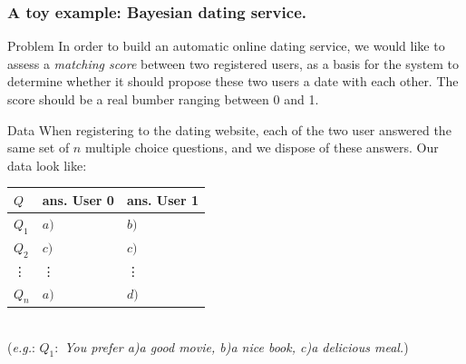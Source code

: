 \documentclass{beamer}
\begin{document}
\begin{frame}
  \frametitle{A toy example: Bayesian dating service.}
  \begin{exampleblock}{Problem}
    In order to build an automatic online dating service, we would like to assess a \emph{matching score} between two registered users, as a basis for the system to determine whether it should propose these two users a date with each other. The score should be a real bumber ranging between 0 and 1.
  \end{exampleblock}
  \begin{exampleblock}{Data}
    When registering to the dating website, each of the two user answered the same set of $n$ multiple choice questions, and we dispose of these answers. Our data look like:
    \begin{tabular}{|l|l|l|}
      \hline
      $Q$ & ans. User 0 & ans. User 1\\
      \hline
      $Q_1$ & $a)$ & $b)$\\
      $Q_2$ & $c)$ & $c)$\\
      \vdots & \vdots & \vdots\\
      $Q_n$ & $a)$ & $d)$\\
      \hline
    \end{tabular}\\
    (\emph{e.g.}: $Q_1:$ \emph{You prefer a)a good movie, b)a nice book, c)a delicious meal.}) 
  \end{exampleblock}
\end{frame}
\end{document}
